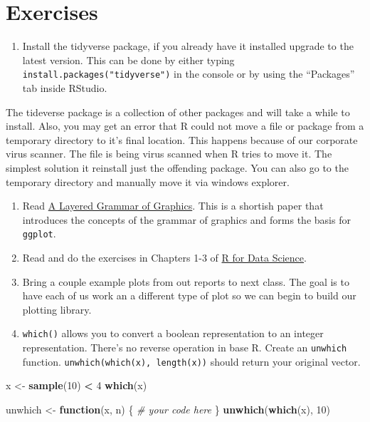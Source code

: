 \documentclass[]{book}
\newenvironment{Shaded}{\begin{snugshade}}{\end{snugshade}}
\newcommand{\KeywordTok}[1]{\textcolor[rgb]{0.13,0.29,0.53}{\textbf{#1}}}
\newcommand{\DecValTok}[1]{\textcolor[rgb]{0.00,0.00,0.81}{#1}}
\newcommand{\StringTok}[1]{\textcolor[rgb]{0.31,0.60,0.02}{#1}}
\newcommand{\CommentTok}[1]{\textcolor[rgb]{0.56,0.35,0.01}{\textit{#1}}}
\newcommand{\ControlFlowTok}[1]{\textcolor[rgb]{0.13,0.29,0.53}{\textbf{#1}}}
\newcommand{\OperatorTok}[1]{\textcolor[rgb]{0.81,0.36,0.00}{\textbf{#1}}}
\newcommand{\NormalTok}[1]{#1}
\providecommand{\tightlist}{%
  \setlength{\itemsep}{0pt}\setlength{\parskip}{0pt}}
\theoremstyle{definition}
\theoremstyle{definition}
\theoremstyle{definition}
\theoremstyle{remark}
\begin{document}
\section{Exercises}\label{exercises-2}

\begin{enumerate}
\def\labelenumi{\arabic{enumi}.}
\tightlist
\item
  Install the tidyverse package, if you already have it installed
  upgrade to the latest version. This can be done by either typing
  \texttt{install.packages("tidyverse")} in the console or by using the
  ``Packages'' tab inside RStudio.
\end{enumerate}

The tideverse package is a collection of other packages and will take a
while to install. Also, you may get an error that R could not move a
file or package from a temporary directory to it's final location. This
happens because of our corporate virus scanner. The file is being virus
scanned when R tries to move it. The simplest solution it reinstall just
the offending package. You can also go to the temporary directory and
manually move it via windows explorer.

\begin{enumerate}
\def\labelenumi{\arabic{enumi}.}
\setcounter{enumi}{1}
\item
  Read \href{http://vita.had.co.nz/papers/layered-grammar.pdf}{A Layered
  Grammar of Graphics}. This is a shortish paper that introduces the
  concepts of the grammar of graphics and forms the basis for
  \texttt{ggplot}.
\item
  Read and do the exercises in Chapters 1-3 of
  \href{http://r4ds.had.co.nz/}{R for Data Science}.
\item
  Bring a couple example plots from out reports to next class. The goal
  is to have each of us work an a different type of plot so we can begin
  to build our plotting library.
\item
  \texttt{which()} allows you to convert a boolean representation to an
  integer representation. There's no reverse operation in base R. Create
  an \texttt{unwhich} function. \texttt{unwhich(which(x),\ length(x))}
  should return your original vector.
\end{enumerate}

\begin{Shaded}
\begin{Highlighting}[]
\NormalTok{x <-}\StringTok{ }\KeywordTok{sample}\NormalTok{(}\DecValTok{10}\NormalTok{) }\OperatorTok{<}\StringTok{ }\DecValTok{4}
\KeywordTok{which}\NormalTok{(x)}

\NormalTok{unwhich <-}\StringTok{ }\ControlFlowTok{function}\NormalTok{(x, n) \{}
  \CommentTok{# your code here}
\NormalTok{\}}
\KeywordTok{unwhich}\NormalTok{(}\KeywordTok{which}\NormalTok{(x), }\DecValTok{10}\NormalTok{)}
\end{Highlighting}
\end{Shaded}
\end{document}
